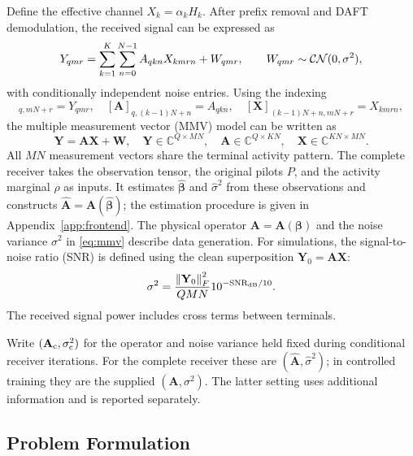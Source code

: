 Define the effective channel $X_k=\alpha_kH_k$.
After prefix removal and DAFT demodulation, the received signal can be expressed as
\begin{equation}
 Y_{qmr}=\sum_{k=1}^K\sum_{n=0}^{N-1}A_{qkn}X_{kmrn}+W_{qmr},
 \qquad W_{qmr}\sim\mathcal{CN}(0,\sigma^2),
 \label{eq:observation-tensor}
\end{equation}
with conditionally independent noise entries.
Using the indexing
\begin{equation}
 [\mathbf Y]_{q,mN+r}=Y_{qmr},\quad
 [\mathbf A]_{q,(k-1)N+n}=A_{qkn},\quad
 [\mathbf X]_{(k-1)N+n,mN+r}=X_{kmrn},
 \label{eq:mmv-indexing}
\end{equation}
the multiple measurement vector (MMV) model can be written as
\begin{equation}
 \mathbf Y=\mathbf A\mathbf X+\mathbf W,\quad
 \mathbf Y\in\mathbb C^{Q\times MN},\quad
 \mathbf A\in\mathbb C^{Q\times KN},\quad
 \mathbf X\in\mathbb C^{KN\times MN}.
 \label{eq:mmv}
\end{equation}
All $MN$ measurement vectors share the terminal activity pattern.
The complete receiver takes the observation tensor, the original pilots $P$,
and the activity marginal $\rho$ as inputs. It estimates
$\widehat{\bm\beta}$ and $\widehat\sigma^2$ from these observations
and constructs $\widehat{\mathbf A}=\mathbf A(\widehat{\bm\beta})$;
the estimation procedure is given in Appendix~\ref{app:frontend}.
The physical operator $\mathbf A=\mathbf A(\bm\beta)$ and the noise
variance $\sigma^2$ in \eqref{eq:mmv} describe data generation.
For simulations, the signal-to-noise ratio (SNR)
is defined using the clean superposition $\mathbf Y_0=\mathbf A\mathbf X$:
\begin{equation}
 \sigma^2=\frac{\left\lVert\mathbf Y_0\right\rVert_F^2}{QMN}
 10^{-\mathrm{SNR}_{\rm dB}/10}.
 \label{eq:snr}
\end{equation}
The received signal power includes cross terms between terminals.

Write $(\mathbf A_{\rm c},\sigma_{\rm c}^2)$ for the operator and noise
variance held fixed during conditional receiver iterations. For the
complete receiver these are $(\widehat{\mathbf A},\widehat\sigma^2)$;
in controlled training they are the supplied $(\mathbf A,\sigma^2)$.
The latter setting uses additional information and is reported separately.

\subsection{Problem Formulation}

